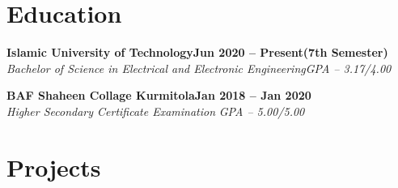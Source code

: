 \documentclass[letterpaper,10pt]{article}
\newcommand{\heading}[2]{
  \hspace{10pt}#1\hfill#2\\
}
\newcommand{\headingBf}[2]{
  \heading{\textbf{#1}}{\textbf{#2}}
}
\newcommand{\headingIt}[2]{
  \heading{\textit{#1}}{\textit{#2}}
}
\newenvironment{resume_list}{
  \vspace{-7pt}
  \begin{itemize}[itemsep=-2px, parsep=1pt, leftmargin=30pt]
}{
  \end{itemize}
}
\begin{document}


  \section{Education}

  \headingBf{Islamic University of Technology}{\textbf{Jun 2020 -- Present(7th Semester)}} %
  \headingIt{Bachelor of Science in Electrical and Electronic Engineering}{GPA -- 3.17/4.00}
  
  \vspace{3pt}
  
  \headingBf{BAF Shaheen Collage Kurmitola}{\textbf{Jan 2018 -- Jan 2020}} %
  \headingIt{Higher Secondary Certificate Examination }{GPA -- 5.00/5.00}


  \section{Projects}
  
\end{document}
